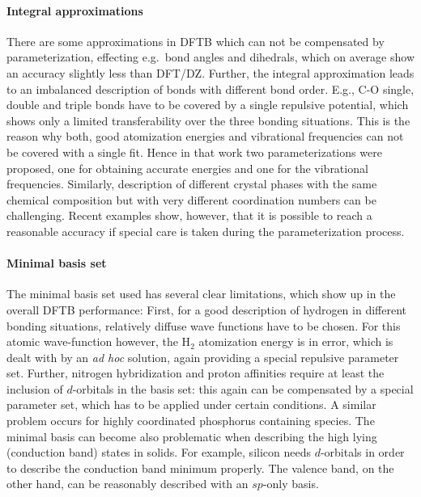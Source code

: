\documentclass[reprint,onecolumn,superscriptaddress]{revtex4-1}
\begin{document}
\paragraph{Integral approximations} There are some approximations
in DFTB which can not be compensated by parameterization, effecting e.g.\ bond
angles and dihedrals, which on average show an accuracy slightly less than
DFT/DZ. Further, the integral approximation leads to an imbalanced description
of bonds with different bond order. E.g., C-O single, double and triple bonds
have to be covered by a single repulsive potential, which shows only a limited
transferability over the three bonding situations. This is the reason why both,
good atomization energies and vibrational frequencies can not be covered with a
single fit.\cite{Gaus2012} Hence in that work two parameterizations were
proposed, one for obtaining accurate energies and one for the vibrational
frequencies.  Similarly, description of different crystal phases with the same
chemical composition but with very different coordination numbers can be
challenging. Recent examples show,\cite{Hellstrom2013,Fihey2015} however, that
it is possible to reach a reasonable accuracy if special care is taken during
the parameterization process.

\paragraph{Minimal basis set}
The minimal basis set used has several clear limitations, which show up in the
overall DFTB performance: First, for a good description of hydrogen in different
bonding situations, relatively diffuse wave functions have to be chosen.  For
this atomic wave-function however, the H$_2$ atomization energy is in error,
which is dealt with by an {\it ad hoc} solution, again providing a special
repulsive parameter set.\cite{Gaus2012} Further, nitrogen hybridization and
proton affinities require at least the inclusion of $d$-orbitals in the basis
set: this again can be compensated by a special parameter set, which has to be
applied under certain conditions.\cite{Gaus2012} A similar problem occurs for
highly coordinated phosphorus containing species.\cite{Gaus2015} The minimal
basis can become also problematic when describing the high lying (conduction
band) states in solids. For example, silicon needs $d$-orbitals in order to
describe the conduction band minimum properly. The valence band, on the other
hand, can be reasonably described with an $sp$-only basis.
\end{document}
